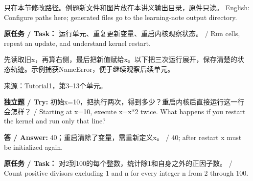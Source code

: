 

只在本节修改路径。例题新文件和图片放在本讲义输出目录，原件只读。
English: Configure paths here; generated files go to the learning-note output directory.











\textbf{原任务 / Task：} 运行单元、重复更新变量、重启内核观察状态。 / Run cells, repeat an update, and understand kernel restart.


先读取旧x，再算右侧，最后把新值赋给x。以下把三次运行展开，保存清楚的状态轨迹。示例捕获NameError，便于继续观察后续单元。


来源：Tutorial1，第3–13个单元。








\textbf{独立题 / Try:} 初始x=10，把执行两次，得到多少？重启内核后直接运行这一行会怎样？ / Starting at x=10, execute x=x*2 twice. What happens if you restart the kernel and run only that line?


\textbf{答 / Answer:} 40；重启清除了变量，需重新定义x。 / 40; after restart x must be initialized again.







\textbf{原任务 / Task：} 对2到100的每个整数，统计除1和自身之外的正因子数。 / Count positive divisors excluding 1 and n for every integer n from 2 through 100.


